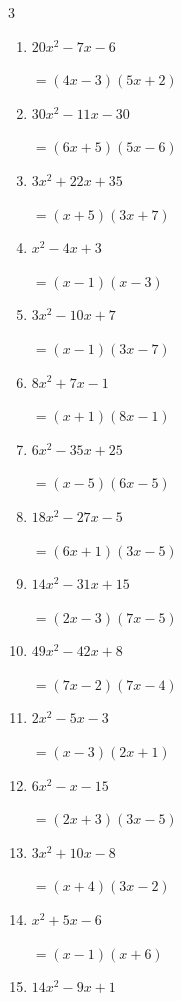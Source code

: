 \begin{multicols}{3}
\begin{enumerate}
        $=(3x-4)(x-1)$

\columnbreak %

\resetques

  \item $20x^{2}-7x-6$

        $=(4x-3)(5x+2)$

  \item $30x^{2}-11x-30$

        $=(6x+5)(5x-6)$

  \item $3x^{2}+22x+35$

        $=(x+5)(3x+7)$

  \item $x^{2}-4x+3$

        $=(x-1)(x-3)$

  \item $3x^{2}-10x+7$

        $=(x-1)(3x-7)$

  \item $8x^{2}+7x-1$

        $=(x+1)(8x-1)$

  \item $6x^{2}-35x+25$

        $=(x-5)(6x-5)$

  \item $18x^{2}-27x-5$

        $=(6x+1)(3x-5)$

  \item $14x^{2}-31x+15$

        $=(2x-3)(7x-5)$

  \item $49x^{2}-42x+8$

        $=(7x-2)(7x-4)$

\columnbreak %

  \item $2x^{2}-5x-3$

        $=(x-3)(2x+1)$

  \item $6x^{2}-x-15$

        $=(2x+3)(3x-5)$

  \item $3x^{2}+10x-8$

        $=(x+4)(3x-2)$

  \item $x^{2}+5x-6$

        $=(x-1)(x+6)$

  \item $14x^{2}-9x+1$


\end{enumerate}
\end{multicols}
